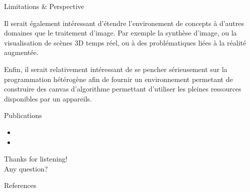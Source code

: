 \documentclass[12pt,aspectratio=169]{beamer}
\newcommand{\themename}{\textbf{\textsc{metropolis}}\xspace}
\begin{document}
\begin{frame}{Limitations \& Perspective}
{    Il serait également intéressant d'étendre l'environement de concepts à d'autres domaines que le traitement d'image. Par exemple la synthèse d'image, ou la visualisation de scènes 3D temps réel, ou à des problématiques liées à la réalité augmentée.
    
    Enfin, il serait relativement intéressant de se pencher sérieusement sur la programmation hétérogène afin de fournir un environnement permetant de construire des canvas d'algorithme permettant d'utiliser les pleines ressources disponibles par un appareils.
  }
\end{frame}

\begin{frame}[allowframebreaks]{Publications}
  \footnotesize
  \begin{itemize}
    \item {}
    \item {}
  \end{itemize}
\end{frame}

{
\begin{frame}[standout]
  Thanks for listening!\\
  Any question?
\end{frame}
}

\maketitle

\appendix

\nocite{geraud.2008.mpool,levillain.2014.ciarp,levillain.2009.ismm,niebler.2014.ranges,roynard.2022.gpce,roynard.2019.rrpr}
\begin{frame}[allowframebreaks]{References}
  \AtNextBibliography{\footnotesize}
  \printbibliography[heading=none]
\end{frame}

%
%
\end{document}
